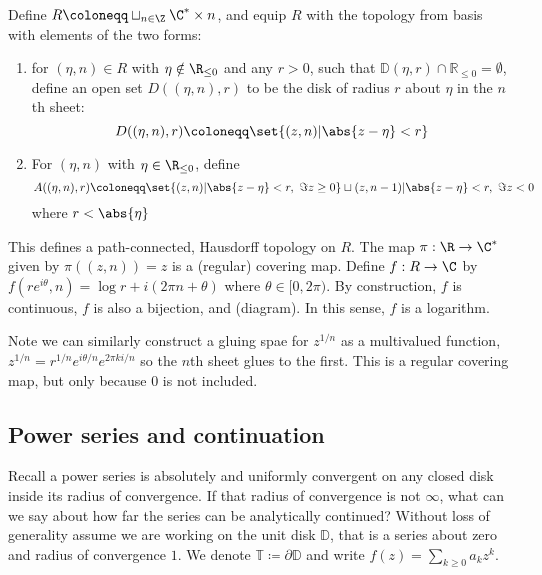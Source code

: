 \documentclass{article}
\begin{document}
Define $R \coloneqq \sqcup_{n\in \Z} \C^* \times {n}$, and equip $R$ with the topology from basis with elements of the two forms:
\begin{enumerate}
    \item for $(\eta, n) \in R$ with $\eta \notin \R_{\leq 0}$ and any $r>0$, such that $\mathbb{D}(\eta, r) \cap \mathbb{R}_{\leq 0} = \emptyset$, define an open set $D((\eta, n), r)$ to be the disk of radius $r$ about $\eta$ in the $n$th sheet:
        \begin{equation}
            D((\eta, n), r) \coloneqq \set{(z, n) | \abs{z - \eta} < r}
        \end{equation}

    \item For $(\eta, n)$ with $\eta \in \R_{\leq 0}$, define
        \begin{equation}
            A((\eta, n), r) \coloneqq \set{(z, n) | \abs{z - \eta} < r, \ \Im{z} \geq 0} \sqcup {(z, n-1) | \abs{z - \eta} < r, \ \Im{z} < 0}
        \end{equation}
        where $r < \abs{\eta}$
\end{enumerate}

This defines a path-connected, Hausdorff topology on $R$. The map $\pi: \R \to \C^*$ given by $\pi((z, n)) = z$ is a (regular) covering map. Define $f:R \to \C$ by $f(r e^{i \theta}, n) = \log r + i (2 \pi n + \theta)$ where $\theta \in [0, 2\pi)$. By construction, $f$ is continuous, $f$ is also a bijection, and (diagram).
In this sense, $f$ is a logarithm.

Note we can similarly construct a gluing spae for $z^{1/n}$ as a multivalued function, $z^{1/n} = r^{1/n} e^{i \theta/n} e^{2 \pi k i/n}$ so the $n$th sheet glues to the first.
This is a regular covering map, but only because $0$ is not included.

\subsection{Power series and continuation}
Recall a power series is absolutely and uniformly convergent on any closed disk inside its radius of convergence. If that radius of convergence is not $\infty$, what can we say about how far the series can be analytically continued? Without loss of generality assume we are working on the unit disk $\mathbb{D}$, that is a series about zero and radius of convergence $1$.  We denote $\mathbb{T} \coloneqq \partial \mathbb{D}$ and write $f(z) = \sum_{k \geq 0} a_k z^k$.
\end{document}
